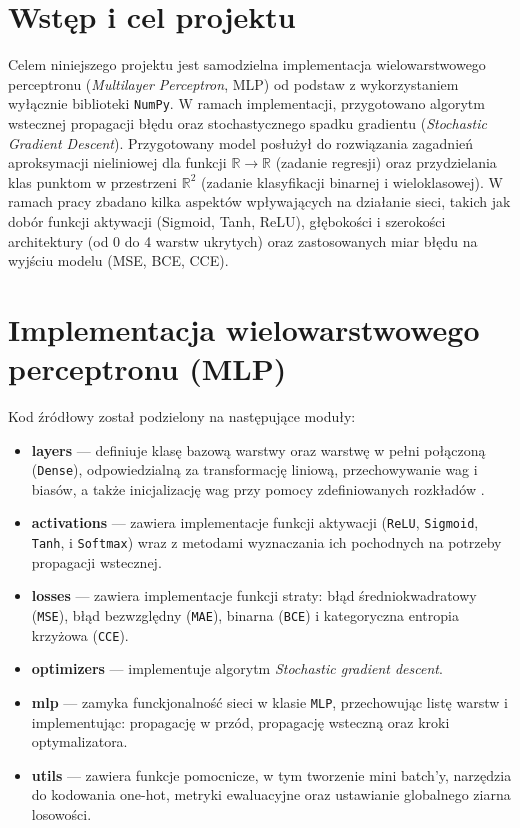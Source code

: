 \documentclass[11pt,a4paper]{article}
\begin{document}
\section{Wstęp i cel projektu}
Celem niniejszego projektu jest samodzielna implementacja wielowarstwowego perceptronu 
(\textit{Multilayer Perceptron}, MLP) od podstaw z wykorzystaniem wyłącznie biblioteki \texttt{NumPy}.
W ramach implementacji, przygotowano algorytm wstecznej propagacji błędu oraz stochastycznego spadku gradientu (\textit{Stochastic Gradient Descent}).
Przygotowany model posłużył do rozwiązania zagadnień aproksymacji nieliniowej dla funkcji $\mathbb{R} \to \mathbb{R}$ 
(zadanie regresji) oraz przydzielania klas punktom w przestrzeni $\mathbb{R}^2$ (zadanie klasyfikacji binarnej i wieloklasowej).
W ramach pracy zbadano kilka aspektów wpływających na działanie sieci, takich jak dobór funkcji aktywacji (Sigmoid, Tanh, ReLU),
głębokości i szerokości architektury (od 0 do 4 warstw ukrytych) oraz zastosowanych miar błędu na wyjściu modelu (MSE, BCE, CCE).

\section{Implementacja wielowarstwowego perceptronu (MLP)}

Kod źródłowy został podzielony na następujące moduły:
\begin{itemize}
    \item \textbf{layers} — definiuje klasę bazową warstwy oraz warstwę w pełni połączoną (\texttt{Dense}),
    odpowiedzialną za transformację liniową, przechowywanie wag i biasów, a także inicjalizację wag przy pomocy zdefiniowanych rozkładów \cite{he_xavier_init}.
    \item \textbf{activations} — zawiera implementacje funkcji aktywacji (\texttt{ReLU}, \texttt{Sigmoid}, \texttt{Tanh}, i \texttt{Softmax})
    wraz z metodami wyznaczania ich pochodnych na potrzeby propagacji wstecznej.
    \item \textbf{losses} — zawiera implementacje funkcji straty: błąd średniokwadratowy (\texttt{MSE}), błąd bezwzględny (\texttt{MAE}), binarna (\texttt{BCE}) i kategoryczna entropia krzyżowa (\texttt{CCE}).
    \item \textbf{optimizers} — implementuje algorytm \textit{Stochastic gradient descent}.
    \item \textbf{mlp} — zamyka funckjonalność sieci w klasie \texttt{MLP}, przechowując listę warstw i implementując: propagację w przód, propagację wsteczną oraz kroki optymalizatora.
    \item \textbf{utils} — zawiera funkcje pomocnicze, w tym tworzenie mini batch'y, narzędzia do kodowania one-hot, metryki ewaluacyjne oraz ustawianie globalnego ziarna losowości.
\end{itemize}
\end{document}
